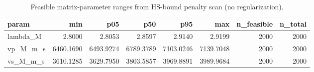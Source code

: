 \begin{table}[ht!]
\centering
\caption{Feasible matrix-parameter ranges from HS-bound penalty scan (no regularization).}
\label{tab:hs\_feasible\_minmax}
\begin{tabular}{lrrrrrrr}
\toprule
\textbf{param} & \textbf{min} & \textbf{p05} & \textbf{p50} & \textbf{p95} & \textbf{max} & \textbf{n\_feasible} & \textbf{n\_total} \\
\midrule
lambda\_M & 2.8000 & 2.8053 & 2.8597 & 2.9140 & 2.9199 & 2000 & 2000 \\
vp\_M\_m\_s & 6460.1690 & 6493.9274 & 6789.3789 & 7103.0246 & 7139.7048 & 2000 & 2000 \\
vs\_M\_m\_s & 3610.1285 & 3629.7950 & 3803.5857 & 3969.8891 & 3989.9684 & 2000 & 2000 \\
\bottomrule
\end{tabular}
\end{table}
